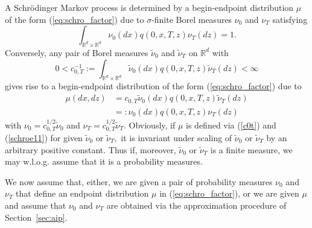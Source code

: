 \documentclass[a4paper,11pt]{amsart}
\theoremstyle{plain}
\theoremstyle{remark}
\begin{document}
A Schr\"{o}dinger Markov process is determined by a begin-endpoint
distribution $\mu$ of the form (\ref{eq:schro_factor}) due to $\sigma$-finite Borel
measures $\nu_{0}$ and $\nu_{T}$ satisfying%
\[
\int_{\mathbb{R}^{d}\times\mathbb{R}^{d}}\nu_{0}(dx)q(0,x,T,z)\nu_{T}(dz)=1.
\]
Conversely, any pair of Borel measures $\widetilde{\nu}_{0}$ and
$\widetilde{\nu}_{T}$ on $\mathbb{R}^{d}$ with%
\begin{equation}
0<c_{0,T}^{-1}:=\int_{\mathbb{R}^{d}\times\mathbb{R}^{d}}\widetilde{\nu}%
_{0}(dx)q(0,x,T,z)\widetilde{\nu}_{T}(dz)<\infty\label{c0t}%
\end{equation}
gives rise to a begin-endpoint distribution of the form (\ref{eq:schro_factor}) due to%
\begin{align}
\mu(dx,dz)  &  =c_{0,T}\widetilde{\nu}_{0}(dx)q(0,x,T,z)\widetilde{\nu}%
_{T}(dz)\label{schroe11}\\
&  =:\nu_{0}(dx)q(0,x,T,z)\nu_{T}(dz)\nonumber
\end{align}
with $\nu_{0}=c_{0,T}^{1/2}\widetilde{\nu}_{0}$ and $\nu_{T}=c_{0,T}%
^{1/2}\widetilde{\nu}_{T}.$ Obviously, if $\mu$ is defined via (\ref{c0t}) and
(\ref{schroe11}) for given $\widetilde{\nu}_{0}$ or $\widetilde{\nu}_{T},$ it
is invariant under scaling of $\widetilde{\nu}_{0}$ or $\widetilde{\nu}_{T}$
by an arbitrary positive constant. Thus if, moreover, $\widetilde{\nu}_{0}$ or
$\widetilde{\nu}_{T}$ is a finite measure, we may w.l.o.g. assume that it is a
probability measures.

We now assume that, either, we are given a pair of probability measures $\nu_0$ and $\nu_T$ that define an endpoint distribution $\mu$ in (\ref{eq:schro_factor}), or we are given $\mu$ and assume
that $\nu_0$ and $\nu_T$ are obtained via the approximation procedure of Section~\ref{sec:aip}. 
\end{document}
